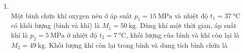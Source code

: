 \begin{enumerate}[label=\bfseries Câu \arabic*:, leftmargin=1.7cm]
\item {}\\
Một bình chứa khí oxygen nén ở áp suất $p_1=\SI{15}{\mega\pascal}$ và nhiệt độ $t_1=\SI{37}{\celsius}$ có khối lượng (bình và khí) là $M_1=\SI{50}{\kilogram}$. Dùng khí một thời gian, áp suất khí là $p_2=\SI{5}{\mega\pascal}$ ở nhiệt độ $t_2=\SI{7}{\celsius}$, khối lượng của bình và khí còn lại là $M_2=\SI{49}{\kilogram}$. Khối lượng khí còn lại trong bình và dung tích bình chứa là


\end{enumerate}
